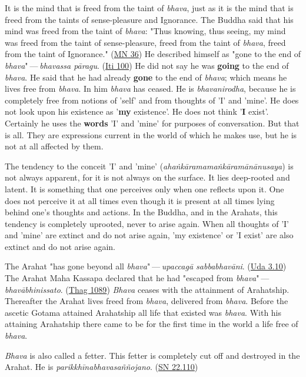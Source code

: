 It is the mind that is freed from the taint of \emph{bhava}, just as it is the mind that is freed from the taints of sense-pleasure and Ignorance. The Buddha said that his mind was freed from the taint of \emph{bhava}: "Thus knowing, thus seeing, my mind was freed from the taint of sense-pleasure, freed from the taint of \emph{bhava}, freed from the taint of Ignorance." (\href{https://suttacentral.net/mn36/en/bodhi}{MN 36}) He described himself as "gone to the end of \emph{bhava}" --- \emph{bhavassa pāragu}. (\href{https://suttacentral.net/iti100/en/sujato}{Iti 100}) He did not say he was \textbf{going} to the end of \emph{bhava}. He said that he had already \textbf{gone} to the end of \emph{bhava}; which means he lives free from \emph{bhava}. In him \emph{bhava} has ceased. He is \emph{bhavanirodha}, because he is completely free from notions of 'self' and from thoughts of 'I' and 'mine'. He does not look upon his existence as '\textbf{my} existence'. He does not think '\textbf{I} exist'. Certainly he uses the \textbf{words} 'I' and 'mine' for purposes of conversation. But that is all. They are expressions current in the world of which he makes use, but he is not at all affected by them.

The tendency to the conceit 'I' and 'mine' (\emph{ahaṅkāramamaṅkāramānānusaya}) is not always apparent, for it is not always on the surface. It lies deep-rooted and latent. It is something that one perceives only when one reflects upon it. One does not perceive it at all times even though it is present at all times lying behind one's thoughts and actions. In the Buddha, and in the Arahats, this tendency is completely uprooted, never to arise again. When all thoughts of 'I' and 'mine' are extinct and do not arise again, 'my existence' or 'I exist' are also extinct and do not arise again.

The Arahat "has gone beyond all \emph{bhava}" --- \emph{upaccagā sabbabhavāni}. (\href{https://suttacentral.net/ud3.10/en/sujato}{Uda 3.10}) The Arahat Maha Kassapa declared that he had "escaped from \emph{bhava}" --- \emph{bhavābhinissato}. (\href{https://suttacentral.net/thag18.1/en/sujato}{Thag 1089}) \emph{Bhava} ceases with the attainment of Arahatship. Thereafter the Arahat lives freed from \emph{bhava}, delivered from \emph{bhava}. Before the ascetic Gotama attained Arahatship all life that existed was \emph{bhava}. With his attaining Arahatship there came to be for the first time in the world a life free of \emph{bhava}.

\emph{Bhava} is also called a fetter. This fetter is completely cut off and destroyed in the Arahat. He is \emph{parikkhīnabhavasaññojano}. (\href{https://suttacentral.net/sn22.110/en/sujato}{SN 22.110})

